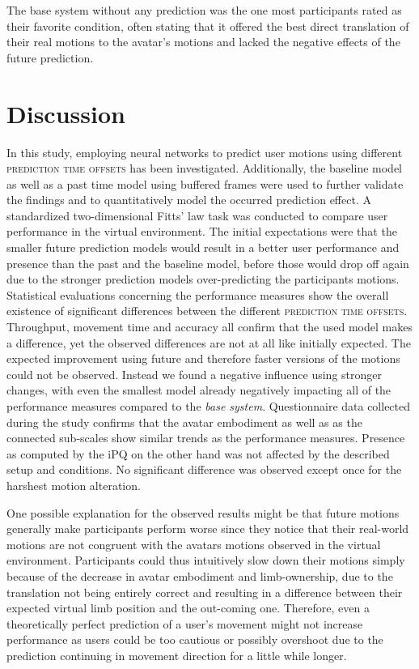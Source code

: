 \documentclass[sigconf]{acmart}
\begin{document}
The base system without any prediction was the one most participants rated as their favorite condition, often stating that it offered the best direct translation of their real motions to the avatar's motions and lacked the negative effects of the future prediction.

\section{Discussion}\label{tit:Discussion}

In this study, employing neural networks to predict user motions using different \textsc{prediction time offsets} has been investigated. Additionally, the baseline model as well as a past time model using buffered frames were used to further validate the findings and to quantitatively model the occurred prediction effect. A standardized two-dimensional Fitts' law task was conducted to compare user performance in the virtual environment.
The initial expectations were that the smaller future prediction models would result in a better user performance and presence than the past and the baseline model, before those would drop off again due to the stronger prediction models over-predicting the participants motions. 
Statistical evaluations concerning the performance measures show the overall existence of significant differences between the different \textsc{prediction time offsets}. Throughput, movement time and accuracy all confirm that the used model makes a difference, yet the observed differences are not at all like initially expected.
The expected improvement using future and therefore faster versions of the motions could not be observed. Instead we found a negative influence using stronger changes, with even the smallest model already negatively impacting all of the performance measures compared to the \textit{base system}. 
Questionnaire data collected during the study confirms that the avatar embodiment as well as as the connected sub-scales show similar trends as the performance measures. 
Presence as computed by the iPQ on the other hand was not affected by the described setup and conditions. No significant difference was observed except once for the harshest motion alteration. 

One possible explanation for the observed results might be that future motions generally make participants perform worse since they notice that their real-world motions are not congruent with the avatars motions observed in the virtual environment. Participants could thus intuitively slow down their motions simply because of the decrease in avatar embodiment and limb-ownership, due to the translation not being entirely correct and resulting in a difference between their expected virtual limb position and the out-coming one. Therefore, even a theoretically perfect prediction of a user's movement might not increase performance as users could be too cautious or possibly overshoot due to the prediction continuing in movement direction for a little while longer.
\end{document}
